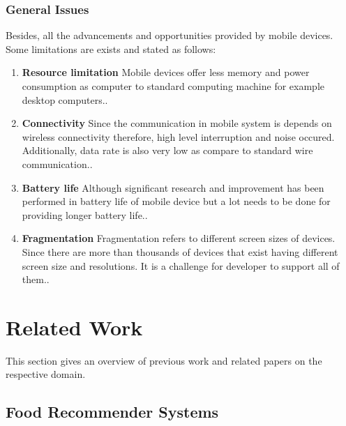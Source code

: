 \subsubsection{General Issues}

Besides, all the advancements and opportunities provided by mobile devices. Some limitations are exists and stated as follows:

\begin{enumerate}
	
	\item \textbf{Resource limitation}\newline 
	Mobile devices offer less memory and power consumption as computer to standard computing machine for example desktop computers.\cite{ricci2010mobile}. 
	
	\item \textbf{Connectivity}\newline 
	Since the communication in mobile system is depends on wireless connectivity therefore, high level interruption and noise occured. Additionally, data rate is also very low as compare to standard wire communication.\cite{ricci2010mobile}.
	
	\item \textbf{Battery life}\newline
	 Although significant research and improvement has been performed in battery life of mobile device but a lot needs to be done for providing longer battery life.\cite{ricci2010mobile}.
	
	\item \textbf{Fragmentation}\newline 
		Fragmentation refers to different screen sizes of devices. Since there are more than thousands of devices that exist having different screen size and resolutions. It is a challenge for developer to support all of them.\cite{ricci2010mobile}.
\end{enumerate}

\section{Related Work}
This section gives an overview of previous work and related papers on the respective domain.

\subsection{Food Recommender Systems}

